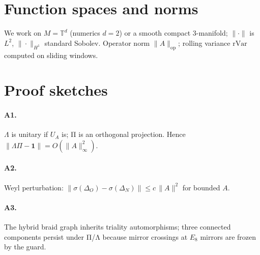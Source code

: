 \section*{Function spaces and norms}
We work on $M=\mathbb{T}^d$ (numerics $d=2$) or a smooth compact 3-manifold; $\|\cdot\|$ is $L^2$, $\|\cdot\|_{H^1}$ standard Sobolev. Operator norm $\|A\|_{\mathrm{op}}$; rolling variance $\mathrm{rVar}$ computed on sliding windows.

\section*{Proof sketches}
\paragraph{A1.} $\Lambda$ is unitary if $U_A$ is; Π is an orthogonal projection. Hence $\|\Lambda\Pi-\mathbf{1}\|=O(\|A\|_\infty^2)$.
\paragraph{A2.} Weyl perturbation: $\|\sigma(\Delta_O)-\sigma(\Delta_N)\|\le c\,\|A\|^2$ for bounded $A$.
\paragraph{A3.} The hybrid braid graph inherits triality automorphisms; three connected components persist under Π/Λ because mirror crossings at $E_8$ mirrors are frozen by the guard.
